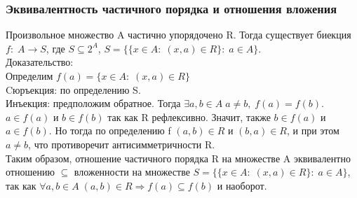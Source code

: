 \subsubsection{Эквивалентность частичного порядка и отношения вложения}
Произвольное множество A частично упорядочено R. Тогда существует биекция $f: \; A \rightarrow S$, где $S \subseteq 2^A$, $S = \{\{x \in A : \; (x, a) \in R\} : \; a \in A\}$. \\ 
Доказательство: \\
Определим $f(a) = \{x \in A : \; (x, a) \in R\}$\\
Cюръекция: по определению S.\\
Инъекция: предположим обратное. Тогда $\exists a, b \in A \; a \not= b, \; f(a) = f(b)$. $a \in f(a)$ и $b \in f(b)$ так как R рефлексивно. Значит, также $b \in f(a)$ и $a \in f(b)$. Но тогда по определению f $(a, b) \in R$ и $(b, a) \in R$, и при этом $a \not= b$, что противоречит антисимметричности R.\\
Таким образом, отношение частичного порядка R на множестве A эквивалентно отношению $\subseteq$ вложенности на множестве $S = \{\{x \in A : \; (x, a) \in R\} : \; a \in A\}$, так как $\forall a, b \in A \; (a, b) \in R \Rightarrow f(a) \subseteq f(b)$ и наоборот.
